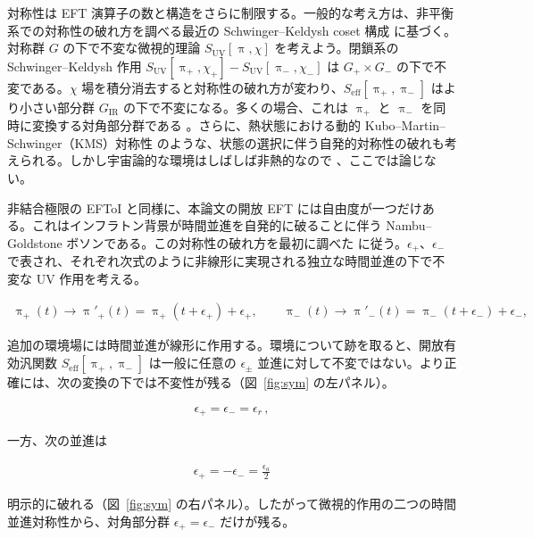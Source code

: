 \documentclass[a4paper,11pt]{ltjsarticle}
\numberwithin{equation}{section}
\newcommand{\Fig}[1]{Fig.~{\ref{#1}}}
\renewcommand{\Fig}[1]{図~\ref{#1}}
\begin{document}
対称性は EFT 演算子の数と構造をさらに制限する。一般的な考え方は、非平衡系での対称性の破れ方を調べる最近の Schwinger--Keldysh coset 構成 \cite{Akyuz:2023lsm} に基づく。対称群 $G$ の下で不変な微視的理論 $S_{\mathrm{UV}}[\uppi,\chi]$ を考えよう。閉鎖系の Schwinger--Keldysh 作用 $S_{\mathrm{UV}}[\uppi_+,\chi_+]-S_{\mathrm{UV}}[\uppi_-,\chi_-]$ は $G_+\times G_-$ の下で不変である。$\chi$ 場を積分消去すると対称性の破れ方が変わり、$S_{\mathrm{eff}}[\uppi_+,\uppi_-]$ はより小さい部分群 $G_{\mathrm{IR}}$ の下で不変になる。多くの場合、これは $\uppi_+$ と $\uppi_-$ を同時に変換する対角部分群である \cite{Akyuz:2023lsm}。さらに、熱状態における動的 Kubo--Martin--Schwinger（KMS）対称性 \cite{Liu:2018kfw} のような、状態の選択に伴う自発的対称性の破れも考えられる。しかし宇宙論的な環境はしばしば非熱的なので \cite{Colas:2022hlq,Hsiang:2021vgx}、ここでは論じない。

非結合極限の EFToI \cite{Creminelli:2006xe,Cheung:2007st,LopezNacir:2011kk} と同様に、本論文の開放 EFT には自由度が一つだけある。これはインフラトン背景が時間並進を自発的に破ることに伴う Nambu--Goldstone ボソンである。この対称性の破れ方を最初に調べた \cite{Hongo:2018ant} に従う。$\epsilon_+$、$\epsilon_-$ で表され、それぞれ次式のように非線形に実現される独立な時間並進の下で不変な UV 作用を考える。

\begin{align}
        \uppi_+(t) \rightarrow \uppi'_+(t) = \uppi_+(t+\epsilon_+)+\epsilon_+,\quad\quad\uppi_-(t) \rightarrow \uppi'_-(t) = \uppi_-(t+\epsilon_-)+\epsilon_-,  
    \end{align}

追加の環境場には時間並進が線形に作用する。環境について跡を取ると、開放有効汎関数 $S_{\mathrm{eff}}[\uppi_+,\uppi_-]$ は一般に任意の $\epsilon_\pm$ 並進に対して不変ではない。より正確には、次の変換の下では不変性が残る（\Fig{fig:sym} の左パネル）\cite{Hongo:2018ant}。

\begin{align}
        \epsilon_+ = \epsilon_- =\epsilon_{r}\,,
    \end{align}

一方、次の並進は

\begin{align}
        \epsilon_+ =  - \epsilon_- =\frac{\epsilon_{a}}{2}
    \end{align}

明示的に破れる（\Fig{fig:sym} の右パネル）。したがって微視的作用の二つの時間並進対称性から、対角部分群 $\epsilon_+=\epsilon_-$ だけが残る。
\end{document}
